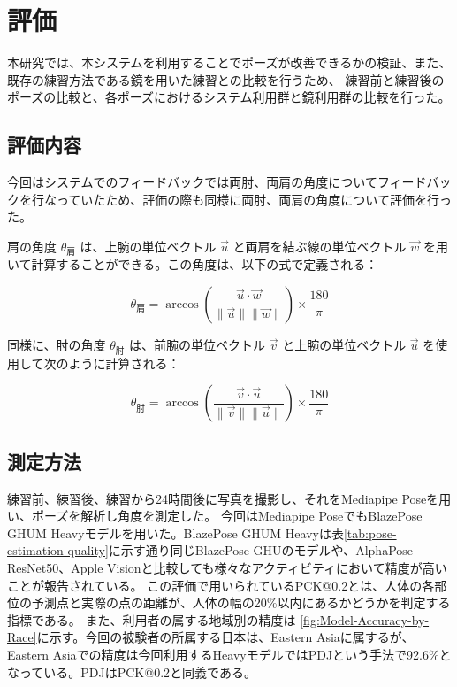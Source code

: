 \chapter{評価}
\label{evaluation}
本研究では、本システムを利用することでポーズが改善できるかの検証、また、既存の練習方法である鏡を用いた練習との比較を行うため、
練習前と練習後のポーズの比較と、各ポーズにおけるシステム利用群と鏡利用群の比較を行った。
\section{評価内容}
今回はシステムでのフィードバックでは両肘、両肩の角度についてフィードバックを行なっていたため、評価の際も同様に両肘、両肩の角度について評価を行った。


肩の角度 \(\theta_{\text{肩}}\) は、上腕の単位ベクトル \(\vec{u}\) と両肩を結ぶ線の単位ベクトル \(\vec{w}\) を用いて計算することができる。この角度は、以下の式で定義される：

\[
\theta_{\text{肩}} = \arccos\left( \frac{\vec{u} \cdot \vec{w}}{\|\vec{u}\| \|\vec{w}\|} \right) \times \frac{180}{\pi}
\]


同様に、肘の角度 \(\theta_{\text{肘}}\) は、前腕の単位ベクトル \(\vec{v}\) と上腕の単位ベクトル \(\vec{u}\) を使用して次のように計算される：

\[
\theta_{\text{肘}} = \arccos\left( \frac{\vec{v} \cdot \vec{u}}{\|\vec{v}\| \|\vec{u}\|} \right) \times \frac{180}{\pi}
\]

\section{測定方法}
練習前、練習後、練習から24時間後に写真を撮影し、それをMediapipe Poseを用い、ポーズを解析し角度を測定した。
今回はMediapipe PoseでもBlazePose GHUM Heavyモデルを用いた。BlazePose GHUM Heavyは表\ref{tab:pose-estimation-quality}に示す通り同じBlazePose GHUのモデルや、AlphaPose ResNet50、Apple Visionと比較しても様々なアクティビティにおいて精度が高いことが報告されている。
この評価で用いられているPCK@0.2とは、人体の各部位の予測点と実際の点の距離が、人体の幅の20\%以内にあるかどうかを判定する指標である。\cite{PCK}
また、利用者の属する地域別の精度は \ref{fig:Model-Accuracy-by-Race}に示す。今回の被験者の所属する日本は、Eastern Asiaに属するが、Eastern Asiaでの精度は今回利用するHeavyモデルではPDJという手法で92.6\%となっている。PDJはPCK@0.2と同義である。

